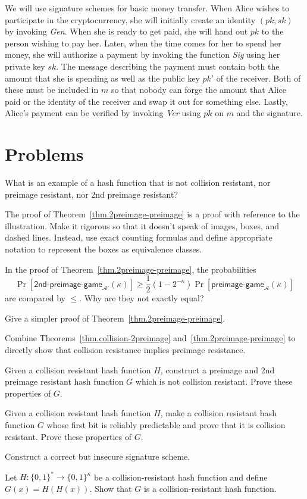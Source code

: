 We will use signature schemes for basic money transfer. When Alice wishes to participate
in the cryptocurrency, she will initially create an identity $(pk, sk)$ by invoking
\emph{Gen}. When she is ready to get paid, she will hand out $pk$ to the person wishing to
pay her. Later, when the time comes for her to spend her money, she will authorize a payment
by invoking the function \emph{Sig} using her private key $sk$. The message describing
the payment must contain both the amount that she is spending as well as the public key
$pk'$ of the receiver. Both of these must be included in $m$ so that nobody can forge
the amount that Alice paid or the identity of the receiver and swap it out for something
else. Lastly, Alice's payment can be verified by invoking \emph{Ver} using $pk$ on $m$ and the signature.

\section*{Problems}

\begin{problems}
  \item What is an example of a hash function that is not collision resistant, nor preimage resistant, nor
        2nd preimage resistant?
  \item The proof of Theorem~\ref{thm.2preimage-preimage} is a proof with reference to the illustration. Make it rigorous so that it doesn't speak of images, boxes, and dashed lines. Instead, use exact counting formulas and define appropriate notation to represent the boxes as equivalence classes.
  \item In the proof of Theorem~\ref{thm.2preimage-preimage}, the probabilities
    \[
      \Pr[\textsf{2nd-preimage-game}_{\mathcal{A}'}(\kappa)] \geq \frac{1}{2} (1 - 2^{-\kappa}) \Pr[\textsf{preimage-game}_\mathcal{A}(\kappa)]
    \]
    are compared by $\leq$. Why are they not exactly equal?
  \item Give a simpler proof of Theorem~\ref{thm.2preimage-preimage}.
  \item Combine Theorems~\ref{thm.collision-2preimage} and~\ref{thm.2preimage-preimage} to
        directly show that collision resistance implies preimage resistance.
  \item Given a collision resistant hash function $H$, construct a preimage and 2nd preimage resistant hash
        function $G$ which is not collision resistant. Prove these properties of $G$.
  \item Given a collision resistant hash function $H$,
        make a collision resistant hash function $G$ whose first bit is reliably predictable
        and prove that it is collision resistant. Prove these properties of $G$.\label{problem.small-hash}
  \item Construct a correct but insecure signature scheme.
  \item Let $H:\{0,1\}^* \to \{0,1\}^{\kappa}$ be a collision-resistant hash function and define
        $G(x) = H(H(x))$. Show that $G$ is a collision-resistant hash function.
\end{problems}

